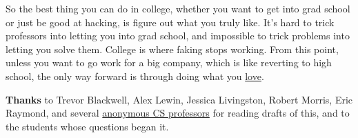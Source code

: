So the best thing you can do in college, whether you want to get into
grad school or just be good at hacking, is figure out what you truly
like. It's hard to trick professors into letting you into grad school,
and impossible to trick problems into letting you solve them. College is
where faking stops working. From this point, unless you want to go work
for a big company, which is like reverting to high school, the only way
forward is through doing what you \href{love.html}{love}.


\textbf{Thanks} to Trevor Blackwell, Alex Lewin, Jessica Livingston,
Robert Morris, Eric Raymond, and several
\href{undergrad2.html}{anonymous CS professors} for reading drafts of
this, and to the students whose questions began it.
